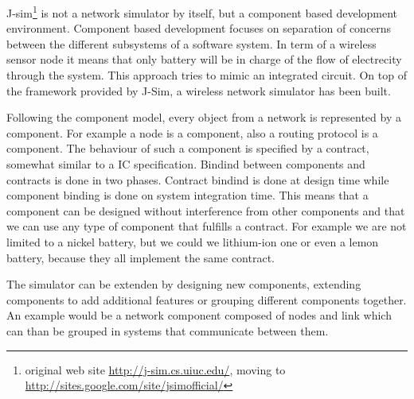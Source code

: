 \label{subsec:jsim}
J-sim\footnote {original web site \url{http://j-sim.cs.uiuc.edu/}, moving to 
\url{http://sites.google.com/site/jsimofficial/}} is not a network simulator
by itself, but a component based development environment. Component based
development focuses on separation of concerns between the different subsystems
of a software system. In term of a wireless sensor node it means that only 
battery will be in charge of the flow of electrecity through the system.
This approach tries to mimic an integrated circuit. On top of the framework 
provided by J-Sim, a wireless network simulator has been built.

Following the component model, every object from a network is represented
by a component. For example a node is a component, also a routing protocol
is a component. The behaviour of such a component is specified by a contract,
somewhat similar to a IC specification. Bindind between components and contracts
is done in two phases. Contract bindind is done at design time while component
binding is done on system integration time. This means that a component can be
designed without interference from other components and that we can use any type
of component that fulfills a contract. For example we are not limited to a nickel
battery, but we could we lithium-ion one or even a lemon battery, because they all
implement the same contract.

The simulator can be extenden by designing new components, extending components to add
additional features or grouping different components together. An example would be a 
network component composed of nodes and link which can than be grouped in systems that
communicate between them.
